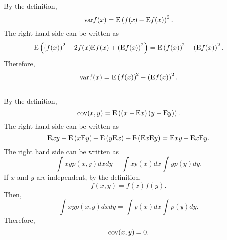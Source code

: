 \subsection{}
\label{1.5}
By the definition, 
%
\begin{equation}
{\rm var} f(x) = {\rm E} \left( f(x) - {\rm E} f(x) \right) ^ 2.
\end{equation}
%
The right hand side can be written as 
%
\begin{equation}
{\rm E} \left( \left( f(x) \right) ^ 2 - 2 f(x) {\rm E} f(x) + \left( {\rm E} f(x) \right) ^ 2 \right) = {\rm E} \left( f(x) \right) ^ 2 - \left( {\rm E} f(x) \right) ^ 2.
\end{equation}
%
Therefore, 
%
\begin{equation}
{\rm var} f(x) = {\rm E} \left( f(x) \right) ^ 2 - \left( {\rm E} f(x) \right) ^ 2.
\end{equation}
%


\subsection{}
\label{1.6}
By the definition,
%
\begin{equation}
{\rm cov} (x, y) = {\rm E} \left( \left( x - {\rm E} x \right) \left( y - {\rm E} y\right) \right).
\end{equation}
%
The right hand side can be written as
%
\begin{equation}
{\rm E} x y - {\rm E} \left( x {\rm E} y \right) - {\rm E} \left( y {\rm E} x \right) + {\rm E} \left( {\rm E} x {\rm E} y \right) = {\rm E} x y - {\rm E} x {\rm E} y.
\end{equation}
%
The right hand side can be written as
%
\begin{equation}
\int x y p(x, y) dx dy - \int x p(x) dx \int y p(y) dy.
\end{equation}
%
If $x$ and $y$ are independent, by the definition,
%
\begin{equation}
f(x, y) = f(x) f(y).
\end{equation}
%
Then,
%
\begin{equation}
\int x y p(x, y) dx dy = \int p(x) dx \int p(y) dy.
\end{equation}
%
Therefore,
%
\begin{equation}
{\rm cov} (x, y) = 0.
\end{equation}
%


